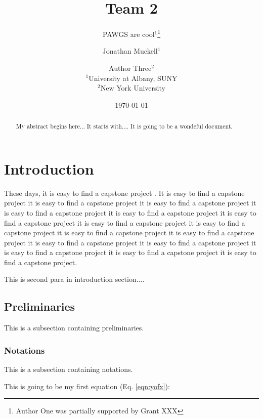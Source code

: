 \documentclass[11pt]{article}
\date{
\today
}
\theoremstyle{plain}
\theoremstyle{definition}
\begin{document}
\title{Team 2}
\author{PAWGS are cool$^1$\thanks{Author One was partially supported by Grant XXX} \and Jonathan Muckell$^1$ \and Author Three$^2$\\
$^1$University at Albany, SUNY\\
$^2$New York University}
	\maketitle
	
\begin{abstract}
My abstract begins here... It starts with.... It is going to be a wondeful document.
		
\end{abstract}


\section{Introduction}
\label{sec:intro}
These days, it is easy to find a capstone project \cite{Atrey2021BrickHouseSecuity}. It is easy to find a capstone project it is easy to find a capstone project it is easy to find a capstone project it is easy to find a capstone project it is easy to find a capstone project it is easy to find a capstone project it is easy to find a capstone project it is easy to find a capstone project it is easy to find a capstone project it is easy to find a capstone project it is easy to find a capstone project it is easy to find a capstone project it is easy to find a capstone project it is easy to find a capstone project it is easy to find a capstone project.

This is second para in introduction section....

\subsection{Preliminaries}\label{sec:prelim}
This is a subsection containing preliminaries.

\subsubsection{Notations}\label{sec:notations}
This is a subsection containing notations.

This is going to be my first equation (Eq. \ref{eqn:yofx}):
	
\end{document}
